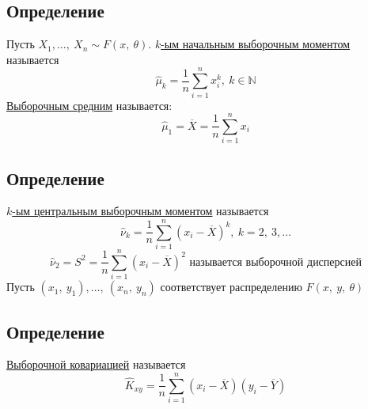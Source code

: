 \documentclass[12pt, a4paper]{article}
\begin{document}
\subsection*{Определение}
Пусть $X_1,\dots,\ X_n \sim F(x,\ \theta)$. \underline{$k$-ым начальным выборочным моментом} называется \[\hat{\mu}_k = \frac{1}{n} \sum_{i = 1}^{n} x_i^k,\ k \in \mathbb{N}\]
\underline{Выборочным средним} называется:
\[\hat{\mu}_1 = \overline{X} = \frac{1}{n} \sum_{i = 1}^{n} x_i\]
\subsection*{Определение}
\underline{$k$-ым центральным выборочным моментом} называется 
\[\hat{\nu}_k = \frac{1}{n} \sum_{i = 1}^{n} {(x_i - \overline{X})}^k,\ k = 2,\ 3,\dots\]
\[\hat{\nu}_2 = S^2 = \frac{1}{n} \sum_{i = 1}^{n} {(x_i - \overline{X})}^2 \text{ называется выборочной дисперсией}\]
Пусть $(x_1,\ y_1),\dots,\ (x_n,\ y_n)$ соответствует распределению $F(x,\ y,\ \theta)$
\subsection*{Определение}
\underline{Выборочной ковариацией} называется
\[\hat{K}_{xy} = \frac{1}{n}\sum_{i = 1}^{n} (x_i - \overline{X}) (y_i - \overline{Y})\]
\end{document}

